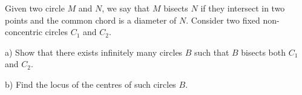 Given two circle $M$ and $N$,  we say that $M$ bisects $N$ if they intersect in two points and the common chord is a diameter of $N$. Consider two fixed non-concentric circles $C_1$ and $C_2$.

a) Show that there exists infinitely many circles $B$ such that $B$ bisects both $C_1$ and $C_2$.

b) Find the locus of the centres of such circles $B$.